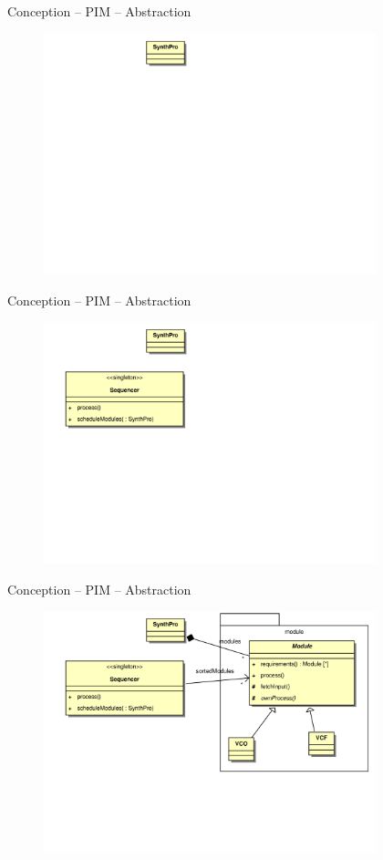 \documentclass[frenchb]{beamer}
\begin{document}
\begin{frame}{Conception -- PIM -- Abstraction}
    \begin{figure}
        \includegraphics[height=7cm ]{../img/ps/business-pim-part1-1.pdf}
    \end{figure}
\end{frame}

\begin{frame}{Conception -- PIM -- Abstraction}
    \begin{figure}
        \includegraphics[height=7cm ]{../img/ps/business-pim-part1-2.pdf}
    \end{figure}
\end{frame}

\begin{frame}{Conception -- PIM -- Abstraction}
    \begin{figure}
        \includegraphics[height=7cm ]{../img/ps/business-pim-part1-3.pdf}
    \end{figure}
\end{frame}
\end{document}
